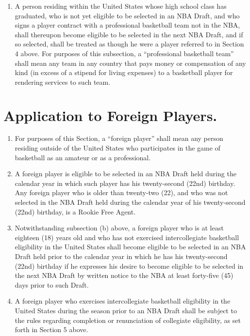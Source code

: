 \documentclass[
]{book}
\providecommand{\tightlist}{%
  \setlength{\itemsep}{0pt}\setlength{\parskip}{0pt}}
\begin{document}
\begin{enumerate}
\begin{enumerate}
  \end{enumerate}
\item
  A person residing within the United States whose high school class has graduated, who is not yet eligible to be selected in an NBA Draft, and who signs a player contract with a professional basketball team not in the NBA, shall thereupon become eligible to be selected in the next NBA Draft, and if so selected, shall be treated as though he were a player referred to in Section 4 above. For purposes of this subsection, a ``professional basketball team'' shall mean any team in any country that pays money or compensation of any kind (in excess of a stipend for living expenses) to a basketball player for rendering services to such team.
\end{enumerate}

\hypertarget{application-to-foreign-players.}{%
\section{Application to Foreign Players.}\label{application-to-foreign-players.}}

\begin{enumerate}
\def\labelenumi{(\alph{enumi})}
\tightlist
\item
  For purposes of this Section, a ``foreign player'' shall mean any person residing outside of the United States who participates in the game of basketball as an amateur or as a professional.
\item
  A foreign player is eligible to be selected in an NBA Draft held during the calendar year in which such player has his twenty-second (22nd) birthday. Any foreign player who is older than twenty-two (22), and who was not selected in the NBA Draft held during the calendar year of his twenty-second (22nd) birthday, is a Rookie Free Agent.
\item
  Notwithstanding subsection (b) above, a foreign player who is at least eighteen (18) years old and who has not exercised intercollegiate basketball eligibility in the United States shall become eligible to be selected in an NBA Draft held prior to the calendar year in which he has his twenty-second (22nd) birthday if he expresses his desire to become eligible to be selected in the next NBA Draft by written notice to the NBA at least forty-five (45) days prior to such Draft.
\item
  A foreign player who exercises intercollegiate basketball eligibility in the United States during the season prior to an NBA Draft shall be subject to the rules regarding completion or renunciation of collegiate eligibility, as set forth in Section 5 above.
\end{enumerate}
\end{document}
